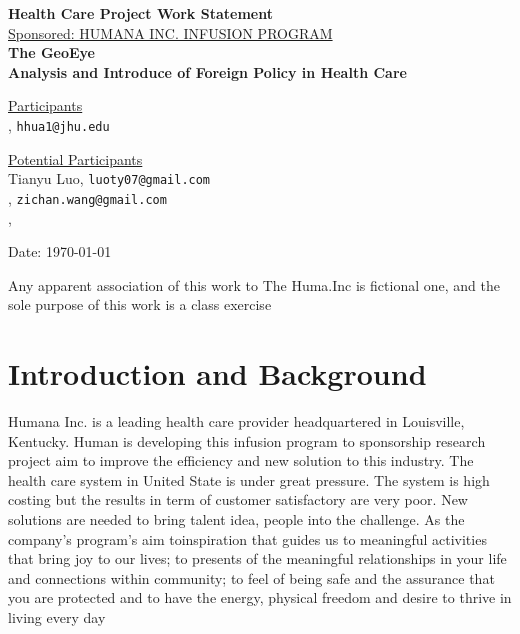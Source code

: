 \documentclass[12pt,letterpaper]{article}
\theoremstyle{definition}
\begin{document}
\def\shiftdowna{0.32in}  %
\def\shiftdownb{0.22in}  %


\begin{center}
\textbf{{\large Health Care Project Work Statement}}\\


\vspace \shiftdowna
\underline {Sponsored: HUMANA INC. INFUSION PROGRAM }\\ 
\vspace{5pt}
\textbf{{\large The GeoEye}}\\


\vspace \shiftdowna
\textbf{{\large Analysis and Introduce of Foreign Policy in Health Care }}


\vspace{0.35in}
\vspace \shiftdownb
\underline {Participants} \\
\vspace{5pt}
, \texttt{hhua1@jhu.edu}

\vspace \shiftdownb
\underline {Potential Participants}\\
\vspace{5pt}
Tianyu Luo, \texttt{luoty07@gmail.com} \\
\vspace{3pt}
, \texttt{zichan.wang@gmail.com} \\
\vspace{3pt}
\text{}, \texttt{}

\vspace \shiftdowna
Date: \today

\end{center}

\vfill  
\footnoterule
\noindent \small{Any apparent association of this work to The Huma.Inc is
fictional one, and the sole purpose of this work is a class exercise}

\newpage

\section{Introduction and Background} 
Humana Inc. is a leading health care provider headquartered in Louisville, Kentucky. Human is developing this infusion program to sponsorship research project aim to improve the efficiency and new solution to this industry. The health care system in United State is under great pressure. The system is high costing but the results in term of customer satisfactory are very poor. New solutions are needed to bring talent idea, people into the challenge. As the company’s program’s aim toinspiration that guides us to meaningful activities that bring joy to our lives; to presents of the meaningful relationships in your life and connections within community; to feel of being safe and the assurance that you are protected and to have the energy, physical freedom and desire to thrive in living every day
\end{document}
